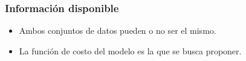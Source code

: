 \begin{frame}
\frametitle{Informaci\'on disponible}
\begin{itemize}
\item Ambos conjuntos de datos pueden o no ser el mismo.
\item La funci\'on de costo del modelo es la que se busca proponer.
\end{itemize}
\end{frame}









